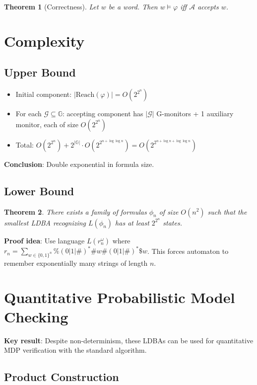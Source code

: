 \documentclass{article}
\newtheorem{theorem}{Theorem}
\begin{document}
\begin{theorem}[Correctness]
Let $w$ be a word. Then $w \models \varphi$ iff $\mathcal{A}$ accepts $w$.
\end{theorem}

\section{Complexity}

\subsection{Upper Bound}

\begin{itemize}
    \item Initial component: $|\text{Reach}(\varphi)| = O(2^{2^n})$
    \item For each $\mathcal{G} \subseteq \mathbb{G}$: accepting component has $|\mathcal{G}|$ G-monitors + 1 auxiliary monitor, each of size $O(2^{2^n})$
    \item Total: $O(2^{2^n}) + 2^{|\mathbb{G}|} \cdot O(2^{2^{n+\log\log n}}) = O(2^{2^{n+\log n + \log\log n}})$
\end{itemize}

\textbf{Conclusion}: Double exponential in formula size.

\subsection{Lower Bound}

\begin{theorem}
There exists a family of formulas $\phi_n$ of size $O(n^2)$ such that the smallest LDBA recognizing $L(\phi_n)$ has at least $2^{2^n}$ states.
\end{theorem}

\textbf{Proof idea}: Use language $L(r_n^\omega)$ where $r_n = \sum_{w \in \{0,1\}^n} \% (0|1|\#)^* \# w \# (0|1|\#)^* \$ w$. This forces automaton to remember exponentially many strings of length $n$.

\section{Quantitative Probabilistic Model Checking}

\textbf{Key result}: Despite non-determinism, these LDBAs can be used for quantitative MDP verification with the standard algorithm.

\subsection{Product Construction}
\end{document}
